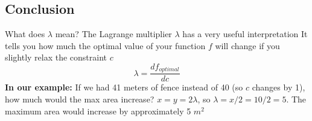 \documentclass[aspectratio=169]{beamer}\usepackage[]{graphicx}\usepackage[]{xcolor}
\begin{document}
\subsection{Conclusion}

\begin{frame}{What does $\lambda$ mean?}
  The Lagrange multiplier $\lambda$ has a very useful interpretation
  \vfill
  It tells you how much the optimal value of your function $f$ will change if you slightly relax the constraint $c$
  \vfill
  $$ \lambda = \frac{df_{optimal}}{dc} $$
  \vfill
  \textbf{In our example:} If we had 41 meters of fence instead of 40 (so $c$ changes by 1), how much would the max area increase?
  \vfill
  $x=y=2\lambda$, so $\lambda = x/2 = 10/2 = 5$.
  The maximum area would increase by approximately 5 $m^2$
\end{frame}




\end{document}
